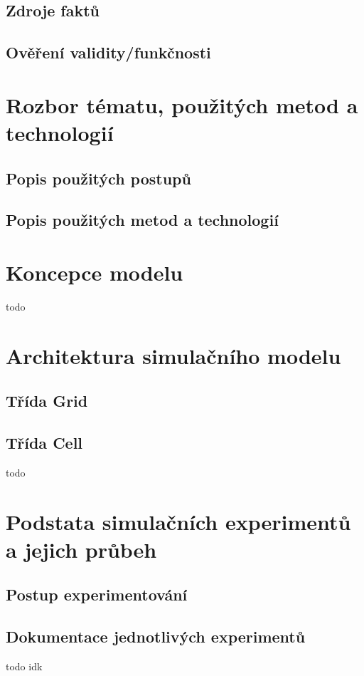 \documentclass[a4paper,11pt]{article}
\begin{document}
\subsection{Zdroje faktů}

\subsection{Ověření validity/funkčnosti}


\section{Rozbor tématu, použitých metod a technologií}
\subsection{Popis použitých postupů}

\subsection{Popis použitých metod a technologií}


\section{Koncepce modelu}
todo

\section{Architektura simulačního modelu}
\subsection{Třída Grid}
\subsection{Třída Cell}
todo


\section{Podstata simulačních experimentů a jejich průbeh}
\subsection{Postup experimentování}
\subsection{Dokumentace jednotlivých experimentů}
todo idk
\end{document}
